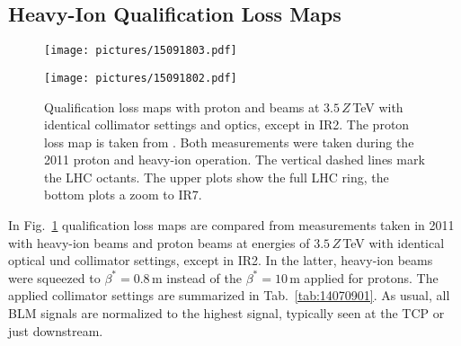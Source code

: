 \subsection{Heavy-Ion Qualification Loss Maps}

\begin{figure}[b]
  \begin{center}
\begin{minipage}[t]{0.49\textwidth}
\texttt{[image: pictures/15091803.pdf]}
\end{minipage}
\begin{minipage}[t]{0.49\textwidth}
\texttt{[image: pictures/15091802.pdf]}
\end{minipage}
\caption{Qualification loss maps with proton and \lead beams at $3.5\,Z\,$TeV with identical collimator settings and optics, except in IR2. The proton loss map is taken from \cite{Bruce2014a}. Both measurements were taken during the 2011 proton and heavy-ion operation. The vertical dashed lines mark the LHC octants. The upper plots show the full LHC ring, the bottom plots a zoom to IR7.}
\label{fig:meas_lm_comparison}
  \end{center}
\end{figure}


In Fig.~\ref{fig:meas_lm_comparison} qualification loss maps are compared from measurements taken in 2011 with heavy-ion beams and proton beams at energies of $3.5\,Z\,$TeV with identical optical und collimator settings, except in IR2. In the latter, heavy-ion beams were squeezed to \mbox{$\beta^*=0.8\,$m} instead of the $\beta^*=10\,$m applied for protons. The applied collimator settings are summarized in Tab.~\ref{tab:14070901}. As usual, all BLM signals are normalized to the highest signal, typically seen at the TCP or just downstream. 

